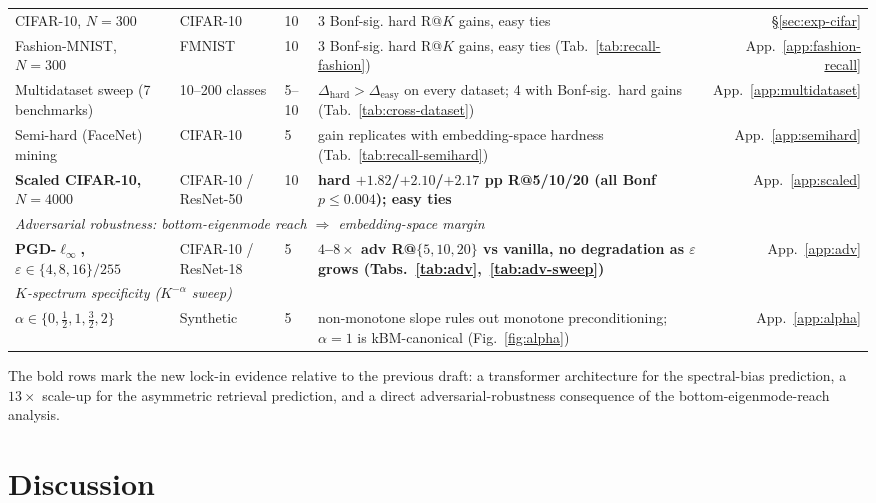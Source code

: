 \documentclass{article}
\begin{document}
\begin{table}[!htbp]
\begin{tabular}{p{3.0cm}p{2.6cm}p{1.4cm}p{4.4cm}r}
\midrule
CIFAR-10, $N\!=\!300$                & CIFAR-10        & 10 & 3 Bonf-sig. hard R@$K$ gains, easy ties & \S\ref{sec:exp-cifar}\\
Fashion-MNIST, $N\!=\!300$           & FMNIST          & 10 & 3 Bonf-sig. hard R@$K$ gains, easy ties (Tab.~\ref{tab:recall-fashion}) & App.~\ref{app:fashion-recall}\\
Multidataset sweep (7 benchmarks)    & 10--200 classes & 5--10 & $\Delta_{\mathrm{hard}}\!>\!\Delta_{\mathrm{easy}}$ on every dataset; 4 with Bonf-sig.\ hard gains (Tab.~\ref{tab:cross-dataset}) & App.~\ref{app:multidataset}\\
Semi-hard (FaceNet) mining           & CIFAR-10        & 5  & gain replicates with embedding-space hardness (Tab.~\ref{tab:recall-semihard}) & App.~\ref{app:semihard}\\
\textbf{Scaled CIFAR-10, $N\!=\!4000$} & CIFAR-10 / ResNet-50 & 10 & \textbf{hard $+1.82$/$+2.10$/$+2.17$ pp R@5/10/20 (all Bonf $p\!\le\!0.004$); easy ties} & App.~\ref{app:scaled}\\
\midrule
\multicolumn{5}{l}{\emph{Adversarial robustness: bottom-eigenmode reach $\Rightarrow$ embedding-space margin}}\\
\midrule
\textbf{PGD-$\ell_\infty$, $\varepsilon\!\in\!\{4,8,16\}/255$} & CIFAR-10 / ResNet-18 & 5 & \textbf{$4$--$8\times$ adv R@$\{5,10,20\}$ vs vanilla, no degradation as $\varepsilon$ grows (Tabs.~\ref{tab:adv},~\ref{tab:adv-sweep})} & App.~\ref{app:adv}\\
\midrule
\multicolumn{5}{l}{\emph{$K$-spectrum specificity ($K^{-\alpha}$ sweep)}}\\
\midrule
$\alpha\!\in\!\{0,\tfrac{1}{2},1,\tfrac{3}{2},2\}$ & Synthetic        & 5  & non-monotone slope rules out monotone preconditioning; $\alpha\!=\!1$ is kBM-canonical (Fig.~\ref{fig:alpha}) & App.~\ref{app:alpha}\\
\bottomrule
\end{tabular}
\end{table}

The bold rows mark the new lock-in evidence relative to the previous
draft: a transformer architecture for the spectral-bias prediction, a
$13\times$ scale-up for the asymmetric retrieval prediction, and a
direct adversarial-robustness consequence of the
bottom-eigenmode-reach analysis.

\section{Discussion}
\label{sec:discussion}
\end{document}
